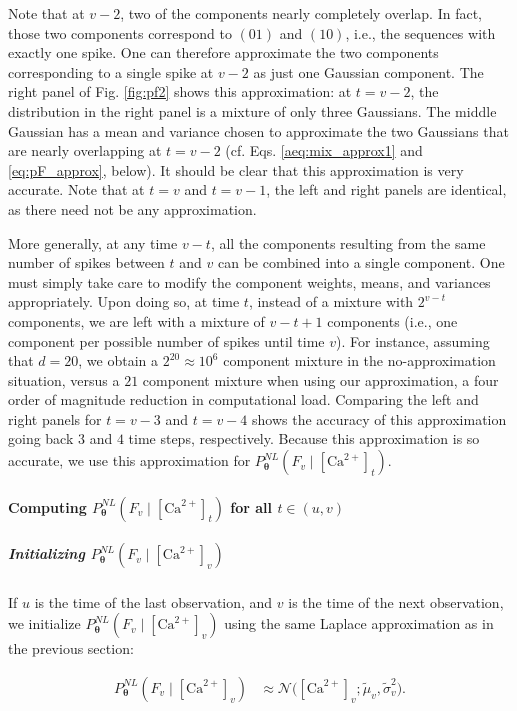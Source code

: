 \documentclass[10pt]{article}
\providecommand{\ve}[1]{\boldsymbol{#1}}
\providecommand{\ve}[1]{\boldsymbol{#1}}
\newcommand{\thetn}{\ve{\theta}}
\newcommand{\p}{P_{\thetn}}
\newcommand{\Ca}{[\text{Ca}^{2+}]}
\begin{document}
Note that at $v-2$, two of the components nearly completely overlap.  In fact, those two components correspond to $(01)$ and $(10)$, i.e., the sequences with exactly one spike.   One can therefore approximate the two components corresponding to a single spike at $v-2$ as just one Gaussian component. The right panel of Fig. \ref{fig:pf2} shows this approximation: at $t=v-2$, the distribution in the right panel is a mixture of only three Gaussians.  The middle Gaussian has a mean and variance chosen to approximate the two Gaussians that are nearly overlapping at $t=v-2$ (cf. Eqs. \ref{aeq:mix_approx1} and \ref{eq:pF_approx}, below).  It should be clear that this approximation is very accurate.  Note that at $t=v$ and $t=v-1$, the left and right panels are identical, as there need not be any approximation.

More generally, at any time $v-t$, all the components resulting from the same number of spikes between $t$ and $v$ can be combined into a single component.  One must simply take care to modify the component weights, means, and variances appropriately.  Upon doing so, at time $t$, instead of a mixture with $2^{v-t}$ components, we are left with a mixture of $v-t+1$ components (i.e., one component per possible number of spikes until time $v$). For instance, assuming that $d=20$, we obtain a $2^{20} \approx 10^6$ component mixture in the no-approximation situation, versus a $21$ component mixture when using our approximation, a four order of magnitude reduction in computational load. Comparing the left and right panels for $t=v-3$ and $t=v-4$ shows the accuracy of this approximation going back $3$ and $4$ time steps, respectively. Because this approximation is so accurate, we use this approximation for $\p^{NL}(F_v \mid \Ca_t)$.

\paragraph{Computing $\p^{NL}(F_v \mid \Ca_t)$ for all $t \in (u,v)$}

\subparagraph{Initializing $\p^{NL}(F_v \mid \Ca_v)$}

If $u$ is the time of the last observation, and $v$ is the time of the next observation, we initialize $\p^{NL}(F_v \mid \Ca_v)$ using the same Laplace approximation as in the previous section:

\begin{align} \label{eq:obs_lik}
\p^{NL}(F_v \mid \Ca_v) &\approx \mathcal{N}\big(\Ca_v; \widetilde{\mu}_v, \widetilde{\sigma}_v^2\big).
\end{align}
\end{document}
